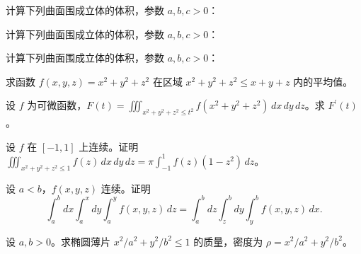 \noindent\begin{minipage}{\textwidth}
计算下列曲面围成立体的体积，参数 $a,b,c>0$：
\end{minipage}\par\vfill
\noindent\begin{minipage}{\textwidth}
计算下列曲面围成立体的体积，参数 $a,b,c>0$：
\end{minipage}\par\vfill
\newpage
\noindent\begin{minipage}{\textwidth}
计算下列曲面围成立体的体积，参数 $a,b,c>0$：
\end{minipage}\par\vfill
\noindent\begin{minipage}{\textwidth}
求函数 $f(x,y,z)=x^2+y^2+z^2$ 在区域 $x^2+y^2+z^2\le x+y+z$ 内的平均值。
\end{minipage}\par\vfill
\noindent\begin{minipage}{\textwidth}
设 $f$ 为可微函数，$\displaystyle F(t)=\iiint_{x^2+y^2+z^2\le t^2}f(x^2+y^2+z^2)\,dx\,dy\,dz$。求 $F^{\prime}(t)$。
\end{minipage}\par\vfill
\noindent\begin{minipage}{\textwidth}
设 $f$ 在 $[-1,1]$ 上连续。证明 $\displaystyle\iiint_{x^2+y^2+z^2\le1}f(z)\,dx\,dy\,dz=\pi\int_{-1}^{1}f(z)(1-z^2)\,dz$。
\end{minipage}\par\vfill
\newpage
\noindent\begin{minipage}{\textwidth}
设 $a<b$，$f(x,y,z)$ 连续。证明\[\int_a^bdx\int_a^xdy\int_a^yf(x,y,z)\,dz=\int_a^bdz\int_z^bdy\int_y^bf(x,y,z)\,dx.\]
\end{minipage}\par\vfill
\noindent\begin{minipage}{\textwidth}
设 $a,b>0$。求椭圆薄片 $x^2/a^2+y^2/b^2\le1$ 的质量，密度为 $\rho=x^2/a^2+y^2/b^2$。
\end{minipage}\par\vfill
